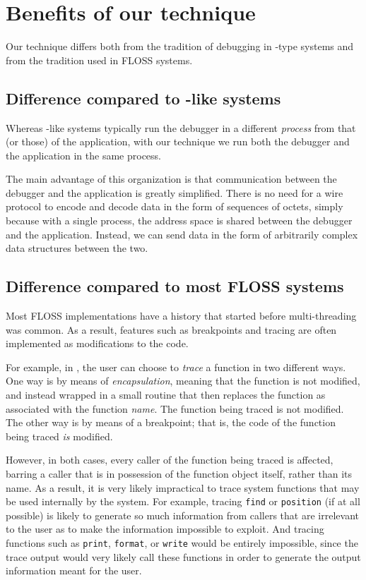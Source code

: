 \section{Benefits of our technique}
\label{sec-benefits}

Our technique differs both from the tradition of debugging in
\unix{}-type systems and from the tradition used in FLOSS
\commonlisp{} systems.

\subsection{Difference compared to \unix{}-like systems}

Whereas \unix{}-like systems typically run the debugger in a different
\emph{process} from that (or those) of the application, with our
technique we run both the debugger and the application in the same
process.

The main advantage of this organization is that communication between
the debugger and the application is greatly simplified.  There is no
need for a wire protocol to encode and decode data in the form of
sequences of octets, simply because with a single process, the address
space is shared between the debugger and the application.  Instead, we
can send data in the form of arbitrarily complex data structures
between the two.

\subsection{Difference compared to most FLOSS \commonlisp{} systems}

Most FLOSS \commonlisp{} implementations have a history that started
before multi-threading was common.  As a result, features such as
breakpoints and tracing are often implemented as modifications to
the code.

For example, in \sbcl{}, the user can choose to
\emph{trace} a function in two different ways.  One way is by means of
\emph{encapsulation}, meaning that the function is not modified, and
instead wrapped in a small routine that then replaces the function as
associated with the function \emph{name}.  The function being traced
is not modified.  The other way is by means of a breakpoint; that is,
the code of the function being traced \emph{is} modified.

However, in both cases, every caller of the function being traced is
affected, barring a caller that is in possession of the function
object itself, rather than its name.  As a result, it is very likely
impractical to trace system functions that may be used internally by
the system.  For example, tracing \texttt{find} or \texttt{position}
(if at all possible) is likely to generate so much information from
callers that are irrelevant to the user as to make
the information impossible to exploit.  And tracing functions such as
\texttt{print}, \texttt{format}, or \texttt{write} would be entirely
impossible, since the trace output would very likely call these
functions in order to generate the output information meant for the
user.


